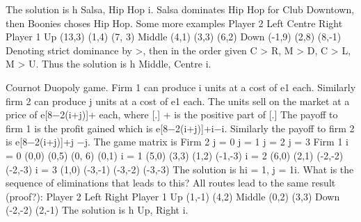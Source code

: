 The solution is h Salsa, Hip Hop i. Salsa dominates Hip Hop for Club Downtown, then
Boonies choses Hip Hop.
Some more examples
Player 2
Left Centre Right
Player 1
Up (13,3) (1,4) (7, 3)
Middle (4,1) (3,3) (6,2)
Down (-1,9) (2,8) (8,-1)
Denoting strict dominance by >, then in the order given C > R, M > D, C > L, M > U.
Thus the solution is h Middle, Centre i.

Cournot Duopoly game. Firm 1 can produce i units at a cost of e1 each. Similarly firm
2 can produce j units at a cost of e1 each. The units sell on the market at a price of
e[8−2(i+j)]+ each, where [.]
+ is the positive part of [.] The payoff to firm 1 is the profit
gained which is e[8−2(i+j)]+i−i. Similarly the payoff to firm 2 is e[8−2(i+j)]+j −j.
The game matrix is
Firm 2
j = 0 j = 1 j = 2 j = 3
Firm 1
i = 0 (0,0) (0,5) (0, 6) (0,1)
i = 1 (5,0) (3,3) (1,2) (-1,-3)
i = 2 (6,0) (2,1) (-2,-2) (-2,-3)
i = 3 (1,0) (-3,-1) (-3,-2) (-3,-3)
The solution is hi = 1, j = 1i. What is the sequence of eliminations that leads to this?
All routes lead to the same result (proof?):
Player 2
Left Right
Player 1
Up (1,-1) (4,2)
Middle (0,2) (3,3)
Down (-2,-2) (2,-1)
The solution is h Up, Right i.
